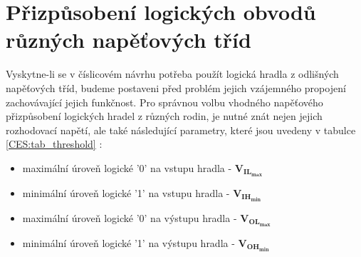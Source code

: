   \section{Přizpůsobení logických obvodů různých napěťových tříd} %
    Vyskytne-li se v číslicovém návrhu potřeba použít logická hradla z odlišných napěťových tříd,
    budeme postaveni před problém jejich vzájemného propojení zachovávající jejich funkčnost. Pro
    správnou volbu vhodného napěťového přizpůsobení logických hradel z různých rodin, je nutné znát
    nejen jejich rozhodovací napětí, ale také následující parametry, které jsou uvedeny v tabulce
    \ref{CES:tab_threshold} \cite[p.~22]{DS41285A}:
    
    \begin{itemize}\addtolength{\itemsep}{-0.5\baselineskip}
      \item maximální úroveň logické '0' na vstupu hradla - $\mathbf{V_{IL_{max}}}$
      \item minimální úroveň logické '1' na vstupu hradla - $\mathbf{V_{IH_{min}}}$
      \item maximální úroveň logické '0' na výstupu hradla - $\mathbf{V_{OL_{max}}}$
      \item minimální úroveň logické '1' na výstupu hradla - $\mathbf{V_{OH_{min}}}$
    \end{itemize}
    
